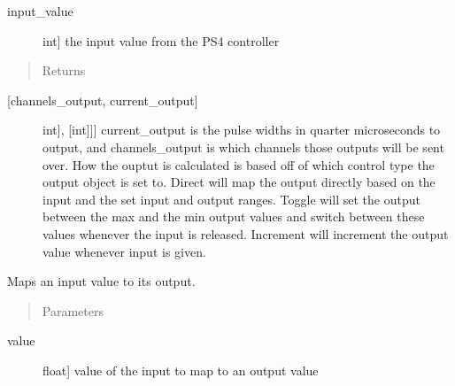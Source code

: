 \documentclass[letterpaper,10pt,english]{sphinxmanual}
\begin{document}
\begin{fulllineitems}
\begin{fulllineitems}
\begin{description}
\item[{input\_value}] \leavevmode{[}int{]}
\sphinxAtStartPar
the input value from the PS4 controller

\end{description}
\begin{quote}\begin{description}
\item[{Returns}] \leavevmode
\end{description}\end{quote}
\begin{description}
\item[{{[}channels\_output, current\_output{]}}] \leavevmode{[}{[}{[}int{]}, {[}int{]}{]}{]}
\sphinxAtStartPar
current\_output is the pulse widths in quarter microseconds to output, and channels\_output
is which channels those outputs will be sent over. How the ouptut is calculated is based
off of which control type the output object is set to. Direct will map the output directly
based on the input and the set input and output ranges. Toggle will set the output between
the max and the min output values and switch between these values whenever the input is
released. Increment will increment the output value whenever input is given.

\end{description}

\end{fulllineitems}


\begin{fulllineitems}
\label{\detokenize{specific:NeckTiltOutput.NeckTiltOutput.map_values}}
\sphinxAtStartPar
Maps an input value to its output.
\begin{quote}\begin{description}
\item[{Parameters}] \leavevmode
\end{description}\end{quote}
\begin{description}
\item[{value}] \leavevmode{[}float{]}
\sphinxAtStartPar
value of the input to map to an output value


\end{description}
\end{fulllineitems}
\end{fulllineitems}
\end{document}
